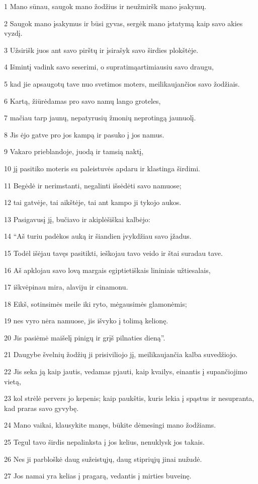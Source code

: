 \par 1 Mano sūnau, saugok mano žodžius ir neužmiršk mano įsakymų. 
\par 2 Saugok mano įsakymus ir būsi gyvas, sergėk mano įstatymą kaip savo akies vyzdį. 
\par 3 Užsirišk juos ant savo pirštų ir įsirašyk savo širdies plokštėje. 
\par 4 Išmintį vadink savo seserimi, o supratimą­artimiausiu savo draugu, 
\par 5 kad jie apsaugotų tave nuo svetimos moters, meilikaujančios savo žodžiais. 
\par 6 Kartą, žiūrėdamas pro savo namų lango groteles, 
\par 7 mačiau tarp jaunų, nepatyrusių žmonių neprotingą jaunuolį. 
\par 8 Jis ėjo gatve pro jos kampą ir pasuko į jos namus. 
\par 9 Vakaro prieblandoje, juodą ir tamsią naktį, 
\par 10 jį pasitiko moteris su paleistuvės apdaru ir klastinga širdimi. 
\par 11 Begėdė ir nerimstanti, negalinti išsėdėti savo namuose; 
\par 12 tai gatvėje, tai aikštėje, tai ant kampo ji tykojo aukos. 
\par 13 Pasigavusį jį, bučiavo ir akiplėšiškai kalbėjo: 
\par 14 “Aš turiu padėkos auką ir šiandien įvykdžiau savo įžadus. 
\par 15 Todėl išėjau tavęs pasitikti, ieškojau tavo veido ir štai suradau tave. 
\par 16 Aš apklojau savo lovą margais egiptietiškais lininiais užtiesalais, 
\par 17 iškvėpinau mira, alaviju ir cinamonu. 
\par 18 Eikš, sotinsimės meile iki ryto, mėgausimės glamonėmis; 
\par 19 nes vyro nėra namuose, jis išvyko į tolimą kelionę. 
\par 20 Jis pasiėmė maišelį pinigų ir grįš pilnaties dieną”. 
\par 21 Daugybe švelnių žodžių ji prisiviliojo jį, meilikaujančia kalba suvedžiojo. 
\par 22 Jis seka ją kaip jautis, vedamas pjauti, kaip kvailys, einantis į supančiojimo vietą, 
\par 23 kol strėlė pervers jo kepenis; kaip paukštis, kuris lekia į spąstus ir nesupranta, kad praras savo gyvybę. 
\par 24 Mano vaikai, klausykite manęs, būkite dėmesingi mano žodžiams. 
\par 25 Tegul tavo širdis nepalinksta į jos kelius, nenuklysk jos takais. 
\par 26 Nes ji parbloškė daug sužeistųjų, daug stipriųjų jinai nužudė. 
\par 27 Jos namai yra kelias į pragarą, vedantis į mirties buveinę.



